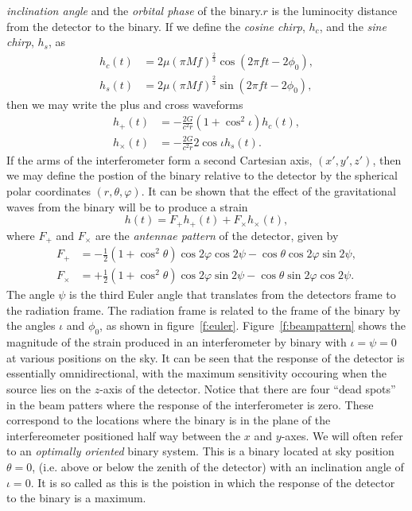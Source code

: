 \emph{inclination angle} and the \emph{orbital phase} of the binary.$r$ is the
luminocity distance from the detector to the binary.  If we define the
\emph{cosine chirp}, $h_c$,  and the \emph{sine chirp}, $h_s$, as 
\begin{align}
h_c(t) & = 2\mu (\pi M f)^{\frac{2}{3}} \cos(2\pi f t - 2\phi_0), \\
h_s(t) & = 2\mu (\pi M f)^{\frac{2}{3}} \sin(2\pi f t - 2\phi_0),
\end{align}
then we may write the plus and cross waveforms
\begin{align}
h_+(t) &= - \frac{2G}{c^2 r} (1 + \cos^2\iota) h_c(t), \\
h_\times(t) &= - \frac{2G}{c^2 r} 2\cos\iota h_s(t).
\end{align}
If the arms of the interferometer form a second Cartesian axis, $(x',y',z')$,
then we may define the postion of the binary relative to the detector by the
spherical polar coordinates $(r,\theta,\varphi)$. It can be shown that the
effect of the gravitational waves from the binary will be to produce a
strain\cite{1987MNRAS.224..131S}
\begin{equation}
h(t) = F_+ h_+(t) + F_\times h_\times(t),
\end{equation}
where $F_+$ and $F_\times$ are the \emph{antennae pattern} of the detector,
given by
\begin{align}
F_+ &= -\frac{1}{2}(1 + \cos^2\theta) \cos 2\varphi \cos 2 \psi - 
\cos\theta \cos 2\varphi \sin 2\psi, \\
F_\times &= +\frac{1}{2}( 1 + \cos^2 \theta) \cos 2\varphi \sin 2\psi -
\cos\theta \sin 2\varphi \cos 2 \psi.
\end{align}
The angle $\psi$ is the third Euler angle that translates from the detectors
frame to the radiation frame. The radiation frame is related to the frame of
the binary by the angles $\iota$ and $\phi_0$, as shown in
figure~\ref{f:euler}. Figure~\ref{f:beampattern} shows the magnitude of the 
strain produced in an interferometer by binary with $\iota = \psi = 0$ at
various positions on the sky. It can be seen that the response of the
detector is essentially omnidirectional, with the maximum sensitivity
occouring when the source lies on the $z$-axis of the detector. Notice that
there are four ``dead spots'' in the beam patters where the response of the
interferometer is zero. These correspond to the locations where the binary is
in the plane of the interfereometer positioned half way between the $x$ and
$y$-axes. We will often refer to an \emph{optimally oriented} binary system.
This is a binary located at sky position $\theta = 0$, (i.e. above or below
the zenith of the detector) with an inclination angle of $\iota = 0$. It is so
called as this is the poistion in which the response of the detector to the
binary is a maximum.

